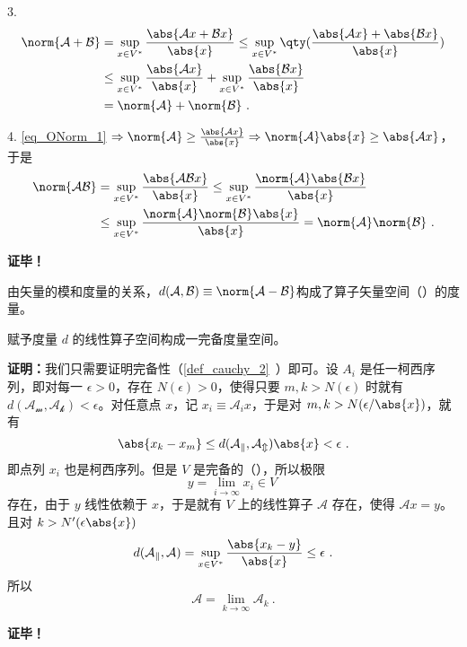 3.\begin{equation}
\begin{aligned}
\norm{\mathcal A+\mathcal B}&=\sup\limits_{x\in{V^*}}\frac{\abs{\mathcal Ax+\mathcal B x}}{\abs{x}}\leq\sup\limits_{x\in{V^*}}\qty(\frac{\abs{\mathcal Ax}+\abs{\mathcal B x}}{\abs{x}})\\
&\leq \sup\limits_{x\in{V^*}}\frac{\abs{ \mathcal Ax}}{\abs{x}}+\sup\limits_{x\in{V^*}}\frac{\abs{\mathcal B x}}{\abs{x}}\\
&=\norm{\mathcal A}+\norm{\mathcal B}~.
\end{aligned}
\end{equation}

4. \autoref{eq_ONorm_1} $\Rightarrow\norm{\mathcal A}\geq\frac{\abs{\mathcal Ax}}{\abs{x}}\Rightarrow \norm{\mathcal A}\abs{x}\geq\abs{\mathcal A x}$，于是
\begin{equation}
\begin{aligned}
\norm{\mathcal{AB}}&=\sup\limits_{x\in{V^*}}\frac{\abs{\mathcal{AB} x}}{\abs{x}}\leq\sup\limits_{x\in{V^*}}\frac{\norm{\mathcal A}\abs{\mathcal{B} x}}{\abs{x}}\\
&\leq\sup\limits_{x\in{V^*}}\frac{\norm{\mathcal A}\norm{\mathcal B}\abs{x}}{\abs{x}}=\norm{\mathcal A}\norm{\mathcal B}~.
\end{aligned}
\end{equation}

\textbf{证毕！}

由矢量的模和度量的关系，$d(\mathcal A,\mathcal B)\equiv\norm{\mathcal{A-B}}$构成了算子矢量空间（）的度量。

\begin{theorem}{}
赋予度量 $d$ 的线性算子空间构成一完备度量空间。
\end{theorem}
\textbf{证明：}我们只需要证明完备性（\autoref{def_cauchy_2}~）即可。设 $A_i$ 是任一柯西序列，即对每一 $\epsilon>0$，存在 $N(\epsilon)>0$，使得只要 $m,k>N(\epsilon)$ 时就有 $d(\mathcal{A_m,A_k})<\epsilon$。对任意点 $x$，记 $x_i\equiv\mathcal A_i x$，于是对 $m,k>N(\epsilon/\abs{x})$，就有
\begin{equation}
\abs{x_k-x_m}\leq d(\mathcal{A_k,A_m})\abs{x}<\epsilon~.
\end{equation}
即点列 $x_i$ 也是柯西序列。但是 $V$ 是完备的（），所以极限
\begin{equation}
y=\lim_{i\rightarrow\infty}x_i\in V~
\end{equation}
存在，由于 $y$ 线性依赖于 $x$，于是就有 $V$ 上的线性算子 $\mathcal A$ 存在，使得 $\mathcal Ax=y$。且对 $k>N'(\epsilon\abs{x})$
\begin{equation}
d(\mathcal{A_k,A})=\sup\limits_{x\in{V^*}}\frac{\abs{x_k -y}}{\abs{x}}\leq\epsilon~.
\end{equation}
所以 
\begin{equation}
\mathcal A=\lim_{k\rightarrow\infty}\mathcal A_k~.
\end{equation}

\textbf{证毕！}